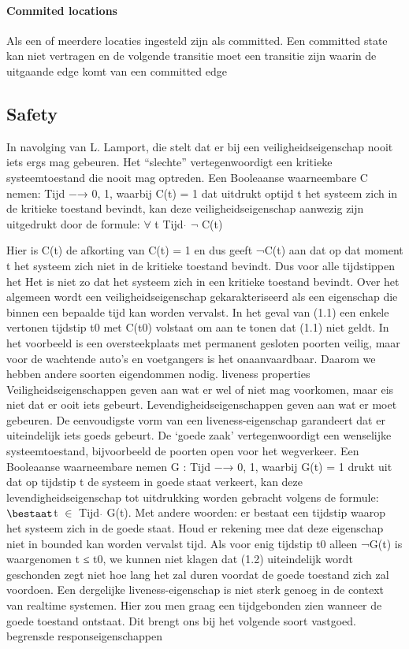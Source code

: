 \documentclass{article}
\begin{document}
	\paragraph{Commited locations}
	
	Als een of meerdere locaties ingesteld zijn als committed. Een committed state kan niet vertragen  en de volgende transitie moet een transitie zijn waarin de uitgaande edge komt van een committed edge
	
	
	
	\subsection{Safety}
	In navolging van L. Lamport, die stelt dat er bij een veiligheidseigenschap  nooit iets ergs mag gebeuren. Het “slechte” vertegenwoordigt een kritieke systeemtoestand die nooit mag optreden. Een Booleaanse waarneembare C nemen: Tijd −→ {0, 1}, waarbij C(t) = 1 dat uitdrukt optijd t het systeem zich in de kritieke toestand bevindt, kan deze veiligheidseigenschap aanwezig zijn uitgedrukt door de formule:
	$\forall$ t \in Tijd $\dot{}$ $\neg$ C(t)
	
	
	Hier is C(t) de afkorting van C(t) = 1 en dus geeft ¬C(t) aan dat op dat moment
	t het systeem zich niet in de kritieke toestand bevindt. Dus voor alle tijdstippen het
	Het is niet zo dat het systeem zich in een kritieke toestand bevindt.
	Over het algemeen wordt een veiligheidseigenschap gekarakteriseerd als een eigenschap die binnen een bepaalde tijd kan worden vervalst. In het geval van (1.1) een enkele vertonen
	tijdstip t0 met C(t0) volstaat om aan te tonen dat (1.1) niet geldt.
	In het voorbeeld is een oversteekplaats met permanent gesloten poorten veilig,
	maar voor de wachtende auto's en voetgangers is het onaanvaardbaar. Daarom
	we hebben andere soorten eigendommen nodig.
	liveness properties
	Veiligheidseigenschappen geven aan wat er wel of niet mag voorkomen,
	maar eis niet dat er ooit iets gebeurt. Levendigheidseigenschappen geven aan wat er moet gebeuren. De eenvoudigste vorm van een liveness-eigenschap garandeert dat er uiteindelijk iets goeds gebeurt. De
	‘goede zaak’ vertegenwoordigt een wenselijke systeemtoestand, bijvoorbeeld de
	poorten open voor het wegverkeer. Een Booleaanse waarneembare nemen
	G : Tijd −→ {0, 1}, waarbij G(t) = 1 drukt uit dat op tijdstip t de
	systeem in goede staat verkeert, kan deze levendigheidseigenschap tot uitdrukking worden gebracht
	volgens de formule:
	$\bestaat$t $\in$ Tijd $\dot{}$ G(t).
	Met andere woorden: er bestaat een tijdstip waarop het systeem zich in de
	goede staat. Houd er rekening mee dat deze eigenschap niet in bounded kan worden vervalst
	tijd. Als voor enig tijdstip t0 alleen ¬G(t) is waargenomen
	t ≤ t0, we kunnen niet klagen dat (1.2) uiteindelijk wordt geschonden
	zegt niet hoe lang het zal duren voordat de goede toestand zich zal voordoen.
	Een dergelijke liveness-eigenschap is niet sterk genoeg in de context van realtime systemen. Hier zou men graag een tijdgebonden zien wanneer de
	goede toestand ontstaat. Dit brengt ons bij het volgende soort vastgoed.
	begrensde responseigenschappen
	
\end{document}
